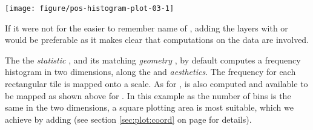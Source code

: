 \documentclass[krantz2]{krantz}\usepackage{knitr}%
\begin{document}
\begin{knitrout}\footnotesize
{}\color{fgcolor}\begin{kframe}
\begin{alltt}
    \hlopt{+}
  \hlstd{(} \hlstd{=} \hlstd{(} \hlstd{=}   \hlstd{=} \hlstd{,}  \hlstd{=} \hlstd{)}
\end{alltt}
\end{kframe}

{\centering \texttt{[image: figure/pos-histogram-plot-03-1]} 

}



\end{knitrout}

If it were not for the easier to remember name of , adding the layers with  or  would be preferable as it makes clear that computations on the data are involved.

\begin{knitrout}\footnotesize
{}\color{fgcolor}\begin{kframe}
\begin{alltt}
    \hlopt{+}
  \hlstd{(} \hlstd{=} \hlstd{,}  \hlstd{=} \hlstd{)}
\end{alltt}
\end{kframe}
\end{knitrout}

The the \emph{statistic} , and its matching \emph{geometry} , by default computes a frequency histogram in two dimensions, along the  and  \emph{aesthetics}. The frequency for each rectangular tile is mapped onto a  scale. As for ,  is also computed and available to be mapped as shown above for . In this example as the number of bins is the same in the two dimensions, a square plotting area is most suitable, which we achieve by adding  (see section \ref{sec:plot:coord} on page \pageref{ sec:plot:coord} for details).
\end{document}
